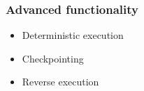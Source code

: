
\begin{frame}
\frametitle{Advanced functionality}

\begin{itemize}
	\item Deterministic execution
	\item Checkpointing
	\item Reverse execution
\end{itemize}

\end{frame}